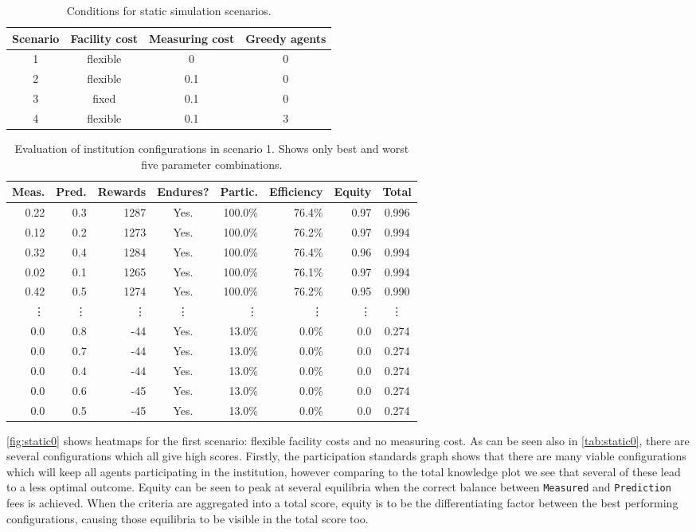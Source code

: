 \begin{table}
\centering
\caption{Conditions for static simulation scenarios.}\label{tab:scenarios}
\begin{tabular}{c||c|c|c}
Scenario & Facility cost & Measuring cost & Greedy agents \\
\hline
1 & flexible & 0 & 0 \\
2 & flexible & 0.1 & 0 \\
3 & fixed & 0.1 & 0 \\
4 & flexible & 0.1 & 3 \\
\end{tabular}
\end{table}

\begin{table}
\centering
\caption{Evaluation of institution configurations in scenario 1. Shows only best and worst five parameter combinations.}\label{tab:static0}
\begin{tabular}{rr|rcrrr|c}
Meas. & Pred. & Rewards & Endures? & Partic. & Efficiency & Equity & Total \\
\hline
0.22 & 0.3 & 1287 & Yes. & 100.0\% & 76.4\% & 0.97 & 0.996 \\
0.12 & 0.2 & 1273 & Yes. & 100.0\% & 76.2\% & 0.97 & 0.994 \\
0.32 & 0.4 & 1284 & Yes. & 100.0\% & 76.4\% & 0.96 & 0.994 \\
0.02 & 0.1 & 1265 & Yes. & 100.0\% & 76.1\% & 0.97 & 0.994 \\
0.42 & 0.5 & 1274 & Yes. & 100.0\% & 76.2\% & 0.95 & 0.990 \\
\vdots & \vdots & \vdots & \vdots & \vdots & \vdots & \vdots & \vdots \\
0.0 & 0.8 & -44 & Yes. & 13.0\% & 0.0\% & 0.0 & 0.274 \\
0.0 & 0.7 & -44 & Yes. & 13.0\% & 0.0\% & 0.0 & 0.274 \\
0.0 & 0.4 & -44 & Yes. & 13.0\% & 0.0\% & 0.0 & 0.274 \\
0.0 & 0.6 & -45 & Yes. & 13.0\% & 0.0\% & 0.0 & 0.274 \\
0.0 & 0.5 & -45 & Yes. & 13.0\% & 0.0\% & 0.0 & 0.274 \\
\end{tabular}
\end{table}

\autoref{fig:static0} shows heatmaps for the first scenario: flexible
facility costs and no measuring cost. As can be seen also in
\autoref{tab:static0}, there are several configurations which all give high
scores. Firstly, the participation standards graph shows that there are many
viable configurations which will keep all agents participating in the
institution, however comparing to the total knowledge plot we see that several of
these lead to a less optimal outcome. Equity can be seen to peak at several
equilibria when the correct balance between \texttt{Measured} and
\texttt{Prediction} fees is achieved. When the criteria are aggregated into a
total score, equity is to be the differentiating factor between the best
performing configurations, causing those equilibria to be visible in the total
score too.

